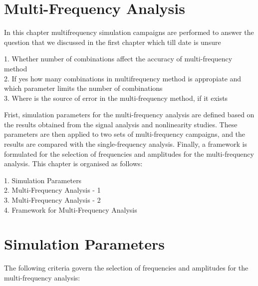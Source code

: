 \documentclass[a4paper, 12pt]{report}
\begin{document}
\section*{Multi-Frequency Analysis}

In this chapter multifrequency simulation campaigns are performed to answer the question that we 
discussed in the first chapter which till date is unsure

\begin{flushleft}
1. Whether number of combinations affect the accuracy of multi-frequency method \\
2. If yes how many combinations in multifrequency method is appropiate and which parameter limits the number of combinations \\
3. Where is the source of error in the multi-frequency method, if it exists \\
\end{flushleft}

Frist, simulation parameters for the multi-frequency analysis are defined based on 
the results obtained from the signal analysis and nonlinearity studies. 
These parameters are then applied to two sets of multi-frequency campaigns, and the results 
are compared with the single-frequency analysis. 
Finally, a framework is formulated for the selection of frequencies and amplitudes for the multi-frequency analysis. 
This chapter is organised as follows:

\begin{flushleft}
\hspace{2cm}1. Simulation Parameters \\
\hspace{2cm}2. Multi-Frequency Analysis - 1 \\
\hspace{2cm}3. Multi-Frequency Analysis - 2 \\
\hspace{2cm}4. Framework for Multi-Frequency Analysis \\
\end{flushleft}

\section{Simulation Parameters}

The following criteria govern the selection of frequencies and amplitudes for the 
multi-frequency analysis:
\end{document}
